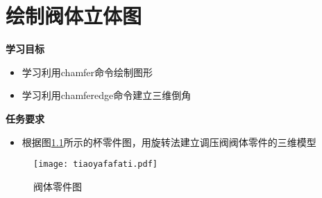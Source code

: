 \chapter{绘制阀体立体图}

{\bfseries 学习目标}
\begin{itemize}
\item 学习利用chamfer命令绘制图形
\item 学习利用chamferedge命令建立三维倒角
\end{itemize}

{\bfseries 任务要求}
\begin{itemize}
\item 根据图\ref{fig:tiaoyafafati}所示的杯零件图，用旋转法建立调压阀阀体零件的三维模型
\end{itemize}

\noindent
\begin{figure}[htbp]
\centering
\texttt{[image: tiaoyafafati.pdf]}
\caption{阀体零件图}\label{fig:tiaoyafafati}
\end{figure}
\endinput